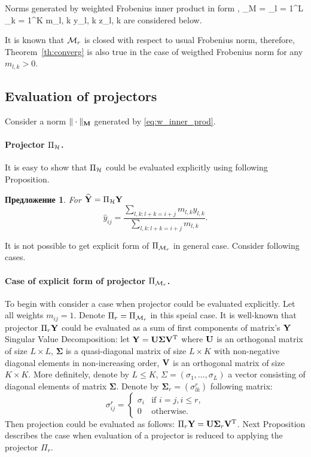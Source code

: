 \documentclass[12pt,a4paper,fleqn,leqno]{article}
\newtheorem{proposition}{Предложение}
\begin{document}
Norms generated by weighted Frobenius inner product in form
\be
\label{eq:w_inner_prod}
\langle\bfY, \bfZ\rangle_M = \sum_{l = 1}^L \sum_{k = 1}^K m_{l, k} y_{l, k} z_{l, k}
\ee
are considered below.

It is known that $\mathcal{M}_r$ is closed with respect to usual Frobenius norm, therefore, Theorem~\ref{th:converg} is also true in the case of weigthed Frobenius norm for any $m_{l,k} > 0$.


\subsection{Evaluation of projectors}

Consider a norm $\|\cdot\|_{\mathbf{M}}$ generated by \eqref{eq:w_inner_prod}.

\paragraph{Projector $\Pi_{\mathcal{H}}$.} It is easy to show that $\Pi_{\mathcal{H}}$
could be evaluated explicitly using following Proposition.

\begin{proposition}
For $\widehat{\mathbf{Y}}=\Pi_{\mathcal{H}} \mathbf{Y}$
\begin{equation*}
\hat{y}_{ij} = \frac{\sum_{l,k: l+k=i+j} m_{l,k} y_{l,k}}{\sum_{l,k: l+k=i+j} m_{l,k}}.
\end{equation*}
\end{proposition}

It is not possible to get explicit form of $\Pi_{\mathcal{M}_r}$ in general case.
Consider following cases.

\paragraph{Case of explicit form of projector $\Pi_{\mathcal{M}_r}$.} To begin with consider a case when projector could be evaluated explicitly.
Let all weights $m_{ij}=1$. Denote $\Pi_r=\Pi_{\mathcal{M}_r}$ in this speial case.
It is well-known that projector $\Pi_{r} \mathbf{Y}$ could be evaluated as a sum of first components of matrix's $\mathbf{Y}$ Singular Value Decomposition: let $\mathbf{Y} = \mathbf{U} \mathbf{\Sigma} \mathbf{V}^{\mathrm{T}}$ where $\mathbf{U}$ is an orthogonal matrix of size $L \times L$, $\mathbf{\Sigma}$ is a quasi-diagonal matrix of size $L \times K$ with non-negative diagonal elements in non-increasing order, $\mathbf{V}$ is an orthogonal matrix of size $K \times K$. More definitely, denote by $L\le K$, $\Sigma = (\sigma_1, \ldots, \sigma_L)$ a vector consisting of diagonal elements of matrix $\mathbf{\Sigma}$. Denote by $\mathbf{\Sigma}_r = (\sigma^r_{l k})$ following matrix:
\begin{equation*}
\sigma^r_{i j} = \begin{cases}
\sigma_i & \text{if $i = j, i \le r,$}\\
0 & \text{otherwise}.
\end{cases}
\end{equation*}
Then projection could be evaluated as follows: $\Pi_{r} \mathbf{Y}  = \mathbf{U} \mathbf{\Sigma}_r \mathbf{V}^{\mathrm{T}}$.
Next Proposition describes the case when evaluation of a projector is reduced to applying the projector  $\Pi_r$.
\end{document}
